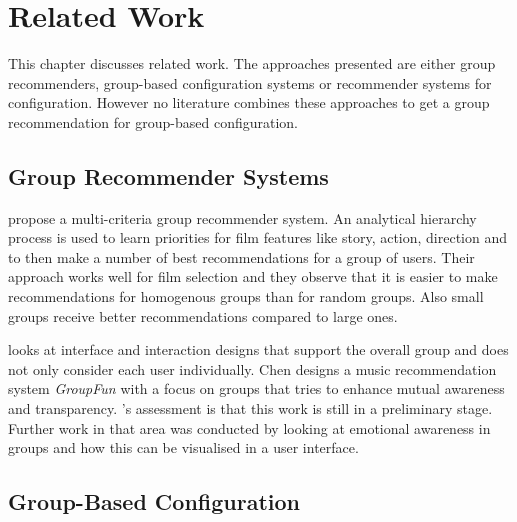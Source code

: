 \chapter{Related Work}
\label{ch:Related_Work}




This chapter discusses related work. The approaches presented are either group recommenders, group-based configuration systems or recommender systems for configuration. However no literature combines these approaches to get a group recommendation for group-based configuration.

\section{Group Recommender Systems}
\label{sec:Related_Work:GroupRecommender}

\begin{description}[style=unboxed, leftmargin=0cm, font=\normalfont]
    \item[\citeauthor{choudharyMulticriteriaGroupRecommender2020} \cite{choudharyMulticriteriaGroupRecommender2020}] propose a multi-criteria group recommender system. An analytical hierarchy process is used to learn priorities for film features like story, action, direction and to then make a number of best recommendations for a group of users. Their approach works well for film selection and they observe that it is easier to make recommendations for homogenous groups than for random groups. Also small groups receive better recommendations compared to large ones.

    \item[\citeauthor{chenInterfaceInteractionDesign2011} \cite{chenInterfaceInteractionDesign2011}] looks at interface and interaction designs that support the overall group and does not only consider each user individually. Chen designs a music recommendation system \emph{GroupFun} with a focus on groups that tries to enhance mutual awareness and transparency. \citeauthor{chenInterfaceInteractionDesign2011}'s assessment is that this work is still in a preliminary stage. Further work in that area was conducted by \citeauthor{chenEmpatheticonsDesigningEmotion2014} \cite{chenEmpatheticonsDesigningEmotion2014} looking at emotional awareness in groups and how this can be visualised in a user interface. 
\end{description}

\section{Group-Based Configuration}
\label{sec:Related_Work:GroupBasedConfiguration}

